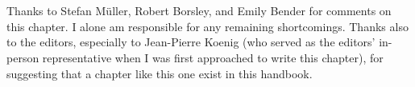 \documentclass[output=paper,biblatex,babelshorthands,newtxmath,draftmode,colorlinks,citecolor=brown]{langscibook}
\begin{document}
\section*{\acknowledgmentsUS}

Thanks to Stefan Müller, Robert Borsley, and Emily Bender for comments on this chapter. I alone am responsible for any remaining shortcomings. Thanks also to the editors, especially to Jean-Pierre Koenig (who served as the editors' in-person representative when I was first approached to write this chapter), for suggesting that a chapter like this one exist in this handbook.  


{\sloppy

\printbibliography[heading=subbibliography,notkeyword=this]
}
\end{document}
